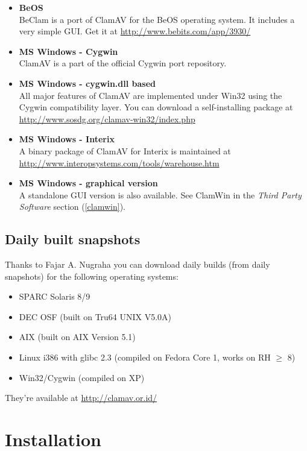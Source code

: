 \documentclass[a4paper,titlepage,12pt]{article}
\begin{document}
\begin{itemize}
	\item \textbf{BeOS}\\
	BeClam is a port of ClamAV for the BeOS operating system. It includes
	a very simple GUI. Get it at \url{http://www.bebits.com/app/3930/}

	\item \textbf{MS Windows - Cygwin}\\
	ClamAV is a part of the official Cygwin port repository.

	\item \textbf{MS Windows - cygwin.dll based}\\
	All major features of ClamAV are implemented under Win32 using the
	Cygwin compatibility layer. You can download a self-installing
	package at\\ \url{http://www.sosdg.org/clamav-win32/index.php}

	\item \textbf{MS Windows - Interix}\\
	A binary package of ClamAV for Interix is maintained at\\
	\url{http://www.interopsystems.com/tools/warehouse.htm}

	\item \textbf{MS Windows - graphical version}\\
	A standalone GUI version is also available. See ClamWin
	in the \emph{Third Party Software} section (\ref{clamwin}).
    \end{itemize}

    \subsection{Daily built snapshots}
    Thanks to Fajar A. Nugraha you can download daily builds (from daily
    snapshots) for the following operating systems:
    \begin{itemize}
	\item SPARC Solaris 8/9
	\item DEC OSF (built on Tru64 UNIX V5.0A)
	\item AIX (built on AIX Version 5.1)
	\item Linux i386 with glibc 2.3 (compiled on Fedora Core 1,
	      works on RH $\ge$ 8)
	\item Win32/Cygwin (compiled on XP)
    \end{itemize}
    They're available at \url{http://clamav.or.id/}

    \section{Installation}
\end{document}

